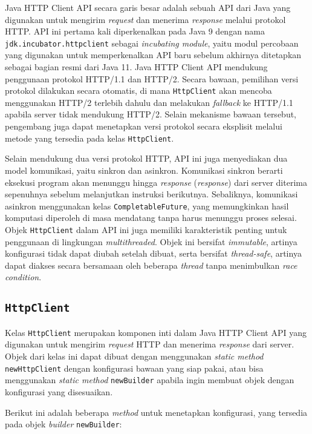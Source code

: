 Java HTTP Client API secara garis besar adalah sebuah API dari Java yang digunakan untuk mengirim \textit{request} dan menerima \textit{response} melalui protokol HTTP. API ini pertama kali diperkenalkan pada Java 9 dengan nama \texttt{jdk.incubator.httpclient} sebagai \textit{incubating module}, yaitu modul percobaan yang digunakan untuk memperkenalkan API baru sebelum akhirnya ditetapkan sebagai bagian resmi dari Java 11. Java HTTP Client API mendukung penggunaan protokol HTTP/1.1 dan HTTP/2. Secara bawaan, pemilihan versi protokol dilakukan secara otomatis, di mana \texttt{HttpClient} akan mencoba menggunakan HTTP/2 terlebih dahulu dan melakukan \textit{fallback} ke HTTP/1.1 apabila server tidak mendukung HTTP/2. Selain mekanisme bawaan tersebut, pengembang juga dapat menetapkan versi protokol secara eksplisit melalui metode yang tersedia pada kelas \texttt{HttpClient}.

Selain mendukung dua versi protokol HTTP, API ini juga menyediakan dua model komunikasi, yaitu sinkron dan asinkron. Komunikasi sinkron berarti eksekusi program akan menunggu hingga \textit{response} (\textit{response}) dari server diterima sepenuhnya sebelum melanjutkan instruksi berikutnya. Sebaliknya, komunikasi asinkron menggunakan kelas \texttt{CompletableFuture}, yang memungkinkan hasil komputasi diperoleh di masa mendatang tanpa harus menunggu proses selesai. Objek \texttt{HttpClient} dalam API ini juga memiliki karakteristik penting untuk penggunaan di lingkungan \textit{multithreaded}. Objek ini bersifat \textit{immutable}, artinya konfigurasi tidak dapat diubah setelah dibuat, serta bersifat \textit{thread-safe}, artinya dapat diakses secara bersamaan oleh beberapa \textit{thread} tanpa menimbulkan \textit{race condition}.

\subsection{\texttt{HttpClient}}
\label{subsec:0228-httpclient}

Kelas \texttt{HttpClient} merupakan komponen inti dalam Java HTTP Client API yang digunakan untuk mengirim \textit{request} HTTP dan menerima \textit{response} dari server. Objek dari kelas ini dapat dibuat dengan menggunakan \textit{static method} \texttt{newHttpClient} dengan konfigurasi bawaan yang siap pakai, atau bisa menggunakan \textit{static method} \texttt{newBuilder} apabila ingin membuat objek dengan konfigurasi yang disesuaikan.

Berikut ini adalah beberapa \textit{method} untuk menetapkan konfigurasi, yang tersedia pada objek \textit{builder} \texttt{newBuilder}:

